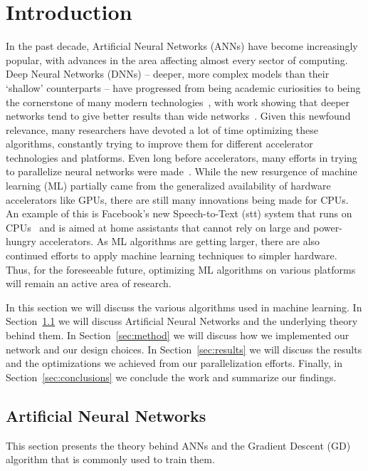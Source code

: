 \section{Introduction} %

In the past decade, Artificial Neural Networks (ANNs) have become increasingly
popular, with advances in the area affecting almost every sector of computing.
Deep Neural Networks (DNNs) \--- deeper, more complex models than their
`shallow' counterparts \--- have progressed from being academic curiosities to
being the cornerstone of many modern technologies~\cite{deep_learning_overview},
with work showing that deeper networks tend to give better results than wide
networks~\cite{VGG}. Given this newfound relevance, many researchers have
devoted a lot of time optimizing these algorithms, constantly trying to improve
them for different accelerator technologies and platforms. Even long before
accelerators, many efforts in trying to parallelize neural networks were
made~\cite{10.1007/BFb0024235}.  While the new resurgence of machine learning
(ML) partially came from the generalized availability of hardware accelerators
like GPUs, there are still many innovations being made for CPUs. An example of
this is Facebook's new Speech-to-Text (stt) system that runs on
CPUs~\cite{fbcpu} and is aimed at home assistants that cannot rely on large and
power-hungry accelerators.  As ML algorithms are getting larger, there are also
continued efforts to apply machine learning techniques to simpler hardware.
Thus, for the foreseeable future, optimizing ML algorithms on various platforms
will remain an active area of research.

In this section we will discuss the various algorithms used in machine learning.
In Section~\ref{sec:ann} we will discuss Artificial Neural Networks and the
underlying theory behind them. In Section~\ref{sec:method} we will discuss how
we implemented our network and our design choices. In Section~\ref{sec:results}
we will discuss the results and the optimizations we achieved from our
parallelization efforts. Finally, in Section~\ref{sec:conclusions} we conclude
the work and summarize our findings.

\subsection{Artificial Neural Networks}\label{sec:ann}

This section presents the theory behind ANNs and the Gradient Descent (GD)
algorithm that is commonly used to train them.

